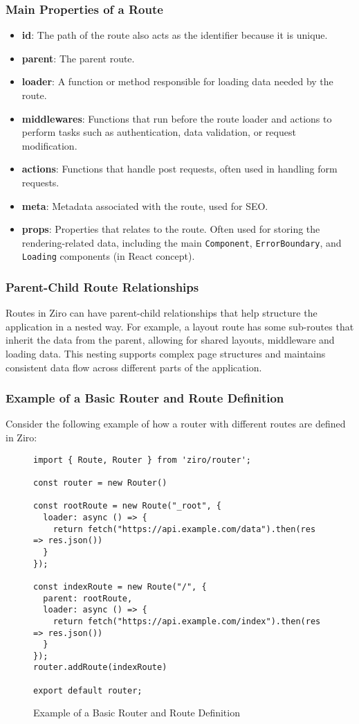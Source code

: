 \subsubsection{Main Properties of a Route}
\begin{itemize}
	\item \textbf{id}: The path of the route also acts as the identifier because it is unique.
	\item \textbf{parent}: The parent route.
	\item \textbf{loader}: A function or method responsible for loading data needed by the route.
	\item \textbf{middlewares}: Functions that run before the route loader and actions to perform tasks such as authentication, data validation, or request modification.
	\item \textbf{actions}: Functions that handle post requests, often used in handling form requests.
	\item \textbf{meta}: Metadata associated with the route, used for SEO.
	\item \textbf{props}: Properties that relates to the route. Often used for storing the rendering-related data, including the main \texttt{Component}, \texttt{ErrorBoundary}, and \texttt{Loading} components (in React concept).
\end{itemize}

\subsubsection{Parent-Child Route Relationships}
Routes in Ziro can have parent-child relationships that help structure the application in a nested way. For example, a layout route has some sub-routes that inherit the data from the parent, allowing for shared layouts, middleware and loading data. This nesting supports complex page structures and maintains consistent data flow across different parts of the application.

\pagebreak

\subsubsection{Example of a Basic Router and Route Definition}
Consider the following example of how a router with different routes are defined in Ziro:

\begin{figure}[h!]
\begin{verbatim}
import { Route, Router } from 'ziro/router';

const router = new Router()

const rootRoute = new Route("_root", {
  loader: async () => {
    return fetch("https://api.example.com/data").then(res => res.json())
  }
});

const indexRoute = new Route("/", {
  parent: rootRoute,
  loader: async () => {
    return fetch("https://api.example.com/index").then(res => res.json())
  }
});
router.addRoute(indexRoute)

export default router;
\end{verbatim}
\caption{Example of a Basic Router and Route Definition}
\end{figure}

